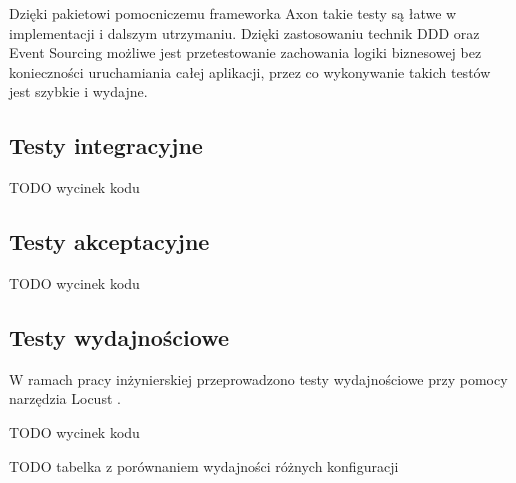 Dzięki pakietowi pomocniczemu frameworka Axon takie testy są łatwe w implementacji i dalszym utrzymaniu. Dzięki zastosowaniu technik DDD oraz Event Sourcing możliwe jest przetestowanie zachowania logiki biznesowej bez konieczności uruchamiania całej aplikacji, przez co wykonywanie takich testów jest szybkie i wydajne.

\subsection{Testy integracyjne}

TODO wycinek kodu

\subsection{Testy akceptacyjne}

TODO wycinek kodu

\subsection{Testy wydajnościowe}

W ramach pracy inżynierskiej przeprowadzono testy wydajnościowe przy pomocy narzędzia Locust \cite{locust}.

TODO wycinek kodu

TODO tabelka z porównaniem wydajności różnych konfiguracji